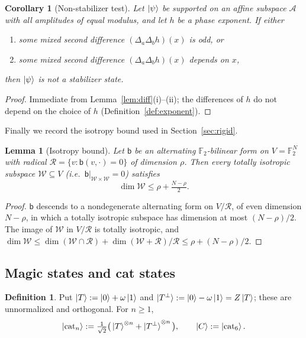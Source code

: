 \documentclass[11pt]{article}
\theoremstyle{plain}
\newtheorem{lemma}[theorem]{Lemma}
\newtheorem{corollary}[theorem]{Corollary}
\theoremstyle{definition}
\newtheorem{definition}[theorem]{Definition}
\newcommand{\F}{\mathbb{F}}
\newcommand{\cat}{\mathrm{cat}}
\newcommand{\bb}{\mathsf{b}}
\begin{document}
\begin{corollary}[Non-stabilizer test]\label{cor:test}
Let $\ket\psi$ be supported on an affine subspace $\mathcal A$ with all amplitudes of
equal modulus, and let $h$ be a phase exponent. If either
\begin{enumerate}[label=(\alph*)]
\item some mixed second difference $(\Delta_a\Delta_bh)(x)$ is odd, or
\item some mixed second difference $(\Delta_a\Delta_bh)(x)$ depends on $x$,
\end{enumerate}
then $\ket\psi$ is not a stabilizer state.
\end{corollary}

\begin{proof}
Immediate from Lemma~\ref{lem:diff}(i)--(ii); the differences of $h$ do not depend on
the choice of $h$ (Definition~\ref{def:exponent}).
\end{proof}

Finally we record the isotropy bound used in Section~\ref{sec:rigid}.

\begin{lemma}[Isotropy bound]\label{lem:isotropy}
Let $\bb$ be an alternating $\F_2$-bilinear form on $V=\F_2^N$ with radical
$\mathcal R=\{v:\bb(v,\cdot)=0\}$ of dimension $\rho$. Then every totally isotropic
subspace $\mathcal W\subseteq V$ (i.e.\ $\bb|_{\mathcal W\times\mathcal W}=0$) satisfies
\[
\dim\mathcal W\le \rho+\tfrac{N-\rho}{2}.
\]
\end{lemma}

\begin{proof}
$\bb$ descends to a nondegenerate alternating form on $V/\mathcal R$, of even dimension
$N-\rho$, in which a totally isotropic subspace has dimension at most $(N-\rho)/2$.
The image of $\mathcal W$ in $V/\mathcal R$ is totally isotropic, and
$\dim\mathcal W\le\dim(\mathcal W\cap\mathcal R)+\dim(\mathcal W+\mathcal R)/\mathcal R
\le\rho+(N-\rho)/2$.
\end{proof}

\subsection{Magic states and cat states}

\begin{definition}\label{def:T}
Put $\ket T:=\ket0+\omega\ket1$ and $\ket{T^\perp}:=\ket0-\omega\ket1=Z\ket T$; these
are unnormalized and orthogonal. For $n\ge1$,
\[
\ket{\cat_n}:=\tfrac1{\sqrt2}\big(\ket T^{\otimes n}+\ket{T^\perp}^{\otimes n}\big),
\qquad \ket C:=\ket{\cat_6}.
\]
\end{definition}
\end{document}
